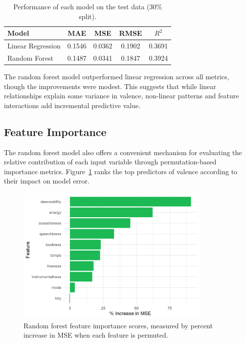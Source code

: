 \documentclass[a4paper,11pt]{article}
\begin{document}
\begin{table}[h]
\centering
\begin{tabular}{lcccc}
\hline
\textbf{Model} & \textbf{MAE} & \textbf{MSE} & \textbf{RMSE} & \textbf{$R^2$} \\
\hline
Linear Regression & 0.1546 & 0.0362 & 0.1902 & 0.3691 \\
Random Forest     & 0.1487 & 0.0341 & 0.1847 & 0.3924 \\
\hline
\end{tabular}
\caption{Performance of each model on the test data (30\% split).}
\label{tab:model_performance}
\end{table}

The random forest model outperformed linear regression across all metrics, though the improvements were modest. This suggests that while linear relationships explain some variance in valence, non-linear patterns and feature interactions add incremental predictive value.

\subsection{Feature Importance}
The random forest model also offers a convenient mechanism for evaluating the relative contribution of each input variable through permutation-based importance metrics. Figure~\ref{fig:feature_importance} ranks the top predictors of valence according to their impact on model error.

\begin{figure}[h]
\centering
\includegraphics[width=0.85\textwidth]{Figure6-rf-feature-importance.png}
\caption{Random forest feature importance scores, measured by percent increase in MSE when each feature is permuted.}
\label{fig:feature_importance}
\end{figure}
\end{document}
